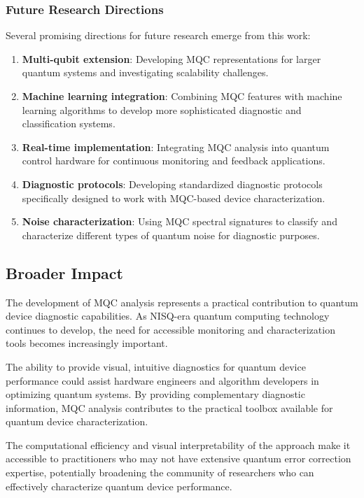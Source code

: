 \subsubsection{Future Research Directions}
Several promising directions for future research emerge from this work:

\begin{enumerate}
\item \textbf{Multi-qubit extension}: Developing MQC representations for larger quantum systems and investigating scalability challenges.

\item \textbf{Machine learning integration}: Combining MQC features with machine learning algorithms to develop more sophisticated diagnostic and classification systems.

\item \textbf{Real-time implementation}: Integrating MQC analysis into quantum control hardware for continuous monitoring and feedback applications.

\item \textbf{Diagnostic protocols}: Developing standardized diagnostic protocols specifically designed to work with MQC-based device characterization.

\item \textbf{Noise characterization}: Using MQC spectral signatures to classify and characterize different types of quantum noise for diagnostic purposes.
\end{enumerate}

\subsection{Broader Impact}

The development of MQC analysis represents a practical contribution to quantum device diagnostic capabilities. As NISQ-era quantum computing technology continues to develop, the need for accessible monitoring and characterization tools becomes increasingly important.

The ability to provide visual, intuitive diagnostics for quantum device performance could assist hardware engineers and algorithm developers in optimizing quantum systems. By providing complementary diagnostic information, MQC analysis contributes to the practical toolbox available for quantum device characterization.

The computational efficiency and visual interpretability of the approach make it accessible to practitioners who may not have extensive quantum error correction expertise, potentially broadening the community of researchers who can effectively characterize quantum device performance.